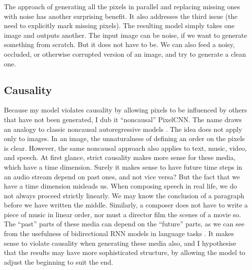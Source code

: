 \documentclass[11pt, a4paper, openany]{book}
\newcommand{\nquote}[1]{``{#1}''}
\begin{document}
The approach of generating all the pixels in parallel and replacing missing ones with noise has another surprising benefit. It also addresses the third issue (the need to explicitly mark missing pixels). The resulting model simply takes one image and outputs another. The input image can be noise, if we want to generate something from scratch. But it does not have to be. We can also feed a noisy, occluded, or otherwise corrupted version of an image, and try to generate a clean one.

\subsection{Causality}

Because my model violates causality by allowing pixels to be influenced by others that have not been generated, I dub it \nquote{noncausal} PixelCNN. The name draws an analogy to classic noncausal autoregressive models \citep{noncausalimage2,noncausaleco2}. The idea does not apply only to images. In an image, the unnaturalness of defining an order on the pixels is clear. However, the same noncausal approach also applies to text, music, video, and speech. At first glance, strict causality makes more sense for these media, which have a time dimension. Surely it makes sense to have future time steps in an audio stream depend on past ones, and not vice versa? But the fact that we have a time dimension misleads us. When composing speech in real life, we do not always proceed strictly linearly. We may know the conclusion of a paragraph before we have written the middle. Similarly, a composer does not have to write a piece of music in linear order, nor must a director film the scenes of a movie so. The \nquote{past} parts of these media can depend on the \nquote{future} parts, as we can see from the usefulness of bidirectional RNN models in language tasks \citep{brnnuse1,brnnuse2,brnnuse3}. It makes sense to violate causality when generating these media also, and I hypothesise that the results may have more sophisticated structure, by allowing the model to adjust the beginning to suit the end.
\end{document}
